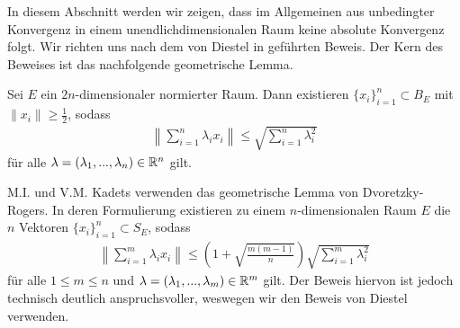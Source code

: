 In diesem Abschnitt werden wir zeigen, dass im Allgemeinen aus unbedingter Konvergenz in einem unendlichdimensionalen Raum keine absolute Konvergenz folgt.
Wir richten uns nach dem von Diestel in \cite{Diestel1995} geführten Beweis.
Der Kern des Beweises ist das nachfolgende geometrische Lemma.




\begin{lem}\label{th:estimate_2n_dim_subspace}
	Sei $ E $ ein $ 2n $-dimensionaler normierter Raum.
	Dann existieren $ \{x_i\}_{i=1}^n \subset B_E $ mit $ \| x_i \| \geq\frac{1}{2} $, sodass
	\begin{align}
		\left\|
		\sum \limits_{i = 1}^n \lambda_i x_i 
		\right\|
		\leq
		\sqrt{
			\sum \limits_{i = 1}^n \lambda_i^2
		}
	\end{align}
	für alle $ \lambda = (\lambda_1,...,\lambda_n) \in \mathbb{R}^n $ gilt.
\end{lem}
M.I. und V.M. Kadets\cite{Kadets1997} verwenden das geometrische Lemma von Dvoretzky-Rogers\cite{DvoretzkyRogers1950}.
In deren Formulierung existieren zu einem $ n $-dimensionalen Raum $ E $ die $ n $ Vektoren $ \{x_i\}_{i=1}^n  \subset S_E $, sodass
\begin{align*}
	\left\|
	\sum \limits_{i = 1}^m \lambda_i x_i 
	\right\|
	\leq
	\left(
	1 + \sqrt{\frac{m(m-1)}{n}}
	\right)
	\sqrt{
		\sum \limits_{i = 1}^m \lambda_i^2
	}
\end{align*}
für alle $ 1 \leq m \leq  n $ und $ \lambda = (\lambda_1,...,\lambda_m) \in \mathbb{R}^m $ gilt.
Der Beweis hiervon ist jedoch technisch deutlich anspruchsvoller, weswegen wir den Beweis von Diestel verwenden.

